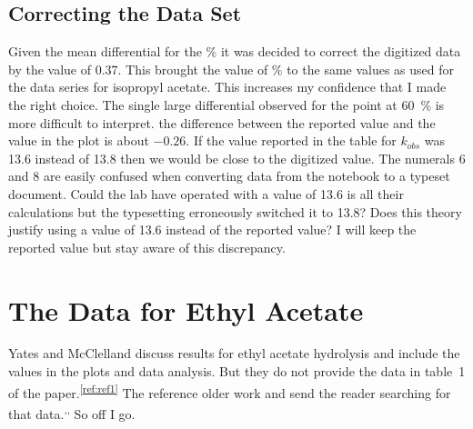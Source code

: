 \documentclass[]{tufte-handout}
\newcommand{\tss}[1]{\textsuperscript{#1}}
\begin{document}
\subsection{Correcting the Data Set}

Given the mean differential for the \% it was decided to correct the digitized data by the value of 0.37. This brought the value of \% to the same values as used for the data series for isopropyl acetate. This increases my confidence that I made the right choice. The single large differential observed for the point at \qty{60}{\percent}   is more difficult to interpret. the difference between the reported value and the value in the plot is about $-0.26$. If the value reported in the table for $k_{obs}$ was 13.6 instead of 13.8 then we would be close to the digitized value. The numerals 6 and 8 are easily confused when converting data from the notebook to a typeset document. Could the lab have operated with a value of 13.6 is all their calculations but the typesetting erroneously switched it to 13.8? Does this theory justify using a value of 13.6 instead of the reported value? I will keep the reported value but stay aware of this discrepancy.

\section{The Data for Ethyl Acetate}

Yates and McClelland discuss results for ethyl acetate hydrolysis and include the values in the plots and data analysis. But they do not provide the data in table~1 of the paper.\tss{\ref{ref:ref1}} The reference older work and send the reader searching for that data.\tss{,}\tss{,} So off I go.
\end{document}
